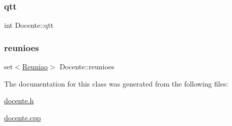 \hypertarget{class_docente_ab29ba6bb97580e8a8bb9dd5f53a532d6}{}\label{class_docente_ab29ba6bb97580e8a8bb9dd5f53a532d6} 
\subsubsection{\texorpdfstring{qtt}{qtt}}
{\footnotesize\ttfamily int Docente\+::qtt\hspace{0.3cm}{\ttfamily [private]}}

\hypertarget{class_docente_a59b98f7d748eb407238f29208f5fb997}{}\label{class_docente_a59b98f7d748eb407238f29208f5fb997} 
\subsubsection{\texorpdfstring{reunioes}{reunioes}}
{\footnotesize\ttfamily set$<$\hyperlink{class_reuniao}{Reuniao}$>$ Docente\+::reunioes\hspace{0.3cm}{\ttfamily [private]}}



The documentation for this class was generated from the following files\+:\begin{DoxyCompactItemize}
\item 
\hyperlink{docente_8h}{docente.\+h}\item 
\hyperlink{docente_8cpp}{docente.\+cpp}\end{DoxyCompactItemize}

